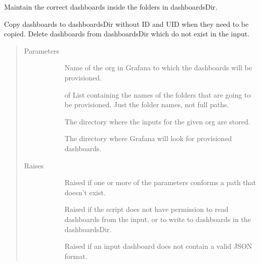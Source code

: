 \documentclass[letterpaper,10pt,english]{sphinxmanual}
\begin{document}
\begin{fulllineitems}
\label{\detokenize{inputs:gpInputs.provisionDashboards}}
Maintain the correct dashboards inside the folders in dashboardsDir.

Copy dashboards to dashboardsDir without ID and UID when they need to be
copied. Delete dashboards from dashboardsDir which do not exist in the input.
\begin{quote}\begin{description}
\item[{Parameters}] \leavevmode\begin{description}
\item[{}] \leavevmode{[}\sphinxtitleref{str}{]}
Name of the org in Grafana to which the dashboards will be provisioned.

\item[{}] \leavevmode{[} of \sphinxtitleref{str}{]}
List containing the names of the folders that are going to be provisioned.
Just the folder names, not full paths.

\item[{}] \leavevmode{[}\sphinxtitleref{str}{]}
The directory where the inputs for the given org are stored.

\item[{}] \leavevmode{[}\sphinxtitleref{str}{]}
The directory where Grafana will look for provisioned dashboards.

\end{description}

\item[{Raises}] \leavevmode\begin{description}
\item[{}] \leavevmode
Raised if one or more of the parameters conforms a path that doesn’t exist.

\item[{}] \leavevmode
Raised if the script does not have permission to read dashboards from the
input, or to write to dashboards in the dashboardsDir.

\item[{}] \leavevmode
Raised if an input dashboard does not contain a valid JSON format.

\end{description}

\end{description}\end{quote}

\end{fulllineitems}
\end{document}
